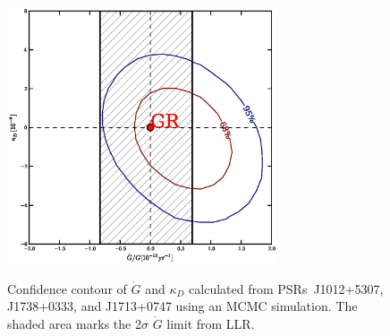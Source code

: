 \documentclass[iop,apj,tighten]{emulateapj}
\begin{document}

\begin{figure}
\includegraphics[width=8cm]{finalGdot.ps} \\ 
\caption {\label{fig:Gdot} Confidence contour of $\dot{G}$ and $\kappa_D$
calculated from PSRs~J1012+5307, J1738+0333, and J1713+0747 using an MCMC simulation.
The shaded area marks the 2$\sigma$ $\dot{G}$ limit from LLR. 
} 
\end{figure} 




%




\end{document}
